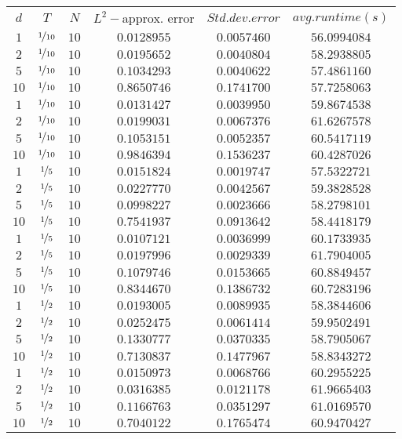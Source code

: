 \begin{tabular}{cccccc}
$d$ & $T$ & $N$ & $L^2-$approx. error & $Std. dev. error$ & $avg. runtime (s)$\\
$1$ & $\nicefrac{1}{10}$ & $10$ & $0.0128955$ & $0.0057460$ & $56.0994084$\\
$2$ & $\nicefrac{1}{10}$ & $10$ & $0.0195652$ & $0.0040804$ & $58.2938805$\\
$5$ & $\nicefrac{1}{10}$ & $10$ & $0.1034293$ & $0.0040622$ & $57.4861160$\\
$10$ & $\nicefrac{1}{10}$ & $10$ & $0.8650746$ & $0.1741700$ & $57.7258063$\\
$1$ & $\nicefrac{1}{10}$ & $10$ & $0.0131427$ & $0.0039950$ & $59.8674538$\\
$2$ & $\nicefrac{1}{10}$ & $10$ & $0.0199031$ & $0.0067376$ & $61.6267578$\\
$5$ & $\nicefrac{1}{10}$ & $10$ & $0.1053151$ & $0.0052357$ & $60.5417119$\\
$10$ & $\nicefrac{1}{10}$ & $10$ & $0.9846394$ & $0.1536237$ & $60.4287026$\\
$1$ & $\nicefrac{1}{5}$ & $10$ & $0.0151824$ & $0.0019747$ & $57.5322721$\\
$2$ & $\nicefrac{1}{5}$ & $10$ & $0.0227770$ & $0.0042567$ & $59.3828528$\\
$5$ & $\nicefrac{1}{5}$ & $10$ & $0.0998227$ & $0.0023666$ & $58.2798101$\\
$10$ & $\nicefrac{1}{5}$ & $10$ & $0.7541937$ & $0.0913642$ & $58.4418179$\\
$1$ & $\nicefrac{1}{5}$ & $10$ & $0.0107121$ & $0.0036999$ & $60.1733935$\\
$2$ & $\nicefrac{1}{5}$ & $10$ & $0.0197996$ & $0.0029339$ & $61.7904005$\\
$5$ & $\nicefrac{1}{5}$ & $10$ & $0.1079746$ & $0.0153665$ & $60.8849457$\\
$10$ & $\nicefrac{1}{5}$ & $10$ & $0.8344670$ & $0.1386732$ & $60.7283196$\\
$1$ & $\nicefrac{1}{2}$ & $10$ & $0.0193005$ & $0.0089935$ & $58.3844606$\\
$2$ & $\nicefrac{1}{2}$ & $10$ & $0.0252475$ & $0.0061414$ & $59.9502491$\\
$5$ & $\nicefrac{1}{2}$ & $10$ & $0.1330777$ & $0.0370335$ & $58.7905067$\\
$10$ & $\nicefrac{1}{2}$ & $10$ & $0.7130837$ & $0.1477967$ & $58.8343272$\\
$1$ & $\nicefrac{1}{2}$ & $10$ & $0.0150973$ & $0.0068766$ & $60.2955225$\\
$2$ & $\nicefrac{1}{2}$ & $10$ & $0.0316385$ & $0.0121178$ & $61.9665403$\\
$5$ & $\nicefrac{1}{2}$ & $10$ & $0.1166763$ & $0.0351297$ & $61.0169570$\\
$10$ & $\nicefrac{1}{2}$ & $10$ & $0.7040122$ & $0.1765474$ & $60.9470427$\\
\end{tabular}
